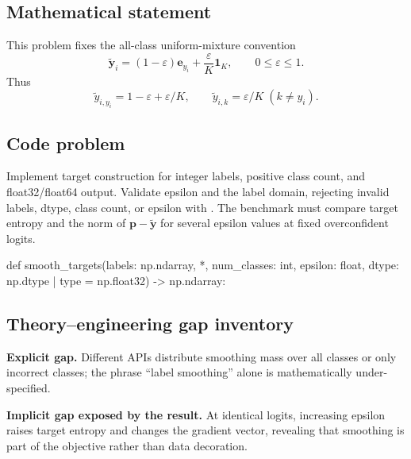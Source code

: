 
        \subsection{Mathematical statement}


This problem fixes the all-class uniform-mixture convention
\[
  \tilde{\bm y}_i=(1-\varepsilon)\bm e_{y_i}
  +\frac{\varepsilon}{K}\bm 1_K,
  \qquad 0\le\varepsilon\le1.
\]
Thus
\[
\tilde y_{i,y_i}=1-\varepsilon+\varepsilon/K,
\qquad
\tilde y_{i,k}=\varepsilon/K\;(k\ne y_i).
\]


        \subsection{Code problem}


Implement target construction for integer labels, positive class count, and
float32/float64 output.\newline
Validate epsilon and the label domain, rejecting invalid labels, dtype, class
count, or epsilon with .  The benchmark
must compare target entropy and the norm of $\bm p-\tilde{\bm y}$ for several
epsilon values at fixed overconfident logits.


        \begin{contractbox}
        \begin{Code}
        def smooth_targets(labels: np.ndarray, *, num_classes: int, epsilon: float, dtype: np.dtype | type = np.float32) -> np.ndarray:
        \end{Code}
        \end{contractbox}

        \subsection{Theory--engineering gap inventory}

        \begin{gapbox}
        \textbf{Explicit gap.} Different APIs distribute smoothing mass over all classes or only incorrect classes; the phrase ``label smoothing'' alone is mathematically under-specified.

        \textbf{Implicit gap exposed by the result.} At identical logits, increasing epsilon raises target entropy and changes the gradient vector, revealing that smoothing is part of the objective rather than data decoration.
        \end{gapbox}

